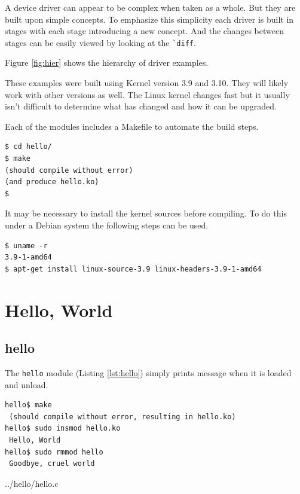 \documentclass{article}
\begin{document}
A device driver can appear to be complex when taken as a whole.
But they are built upon simple concepts.
To emphasize this simplicity each driver is built in stages with
each stage introducing a new concept.
And the changes between stages can be easily viewed by looking
at the \verb+`diff+.

Figure \ref{fig:hier} shows the hierarchy of driver examples.

These examples were built using Kernel version 3.9 and 3.10.
They will likely work with other versions as well.
The Linux kernel changes fast but it usually isn't difficult to
determine what has changed and how it can be upgraded.

Each of the modules includes a Makefile to automate the build steps.

\begin{verbatim}
$ cd hello/
$ make
(should compile without error)
(and produce hello.ko)
$
\end{verbatim}

It may be necessary to install the kernel sources before compiling.
To do this under a Debian\autocite{debian} system the following steps
can be used.

\begin{verbatim}
$ uname -r
3.9-1-amd64
$ apt-get install linux-source-3.9 linux-headers-3.9-1-amd64

\end{verbatim}


\section{Hello, World}

\subsection{hello}

The \verb+hello+ module (Listing \ref{lst:hello}) simply prints message
when it is loaded and unload.

\begin{verbatim}
hello$ make
 (should compile without error, resulting in hello.ko)
hello$ sudo insmod hello.ko
 Hello, World
hello$ sudo rmmod hello
 Goodbye, cruel world
\end{verbatim}


	{../hello/hello.c}
\end{document}
